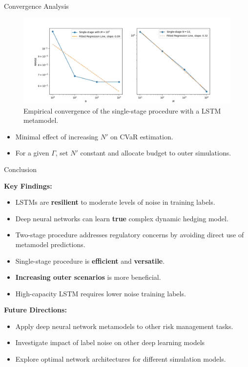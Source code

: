 \documentclass[9pt,handout]{beamer}
\begin{document}
\begin{frame}{Convergence Analysis}
    \begin{figure}[ht!]
        \centering
        \includegraphics[width=\textwidth]{../project2/figures/singleStage/MSEConvergence_lstmLoCap_MN.png}
        \caption{Empirical convergence of the single-stage procedure with a LSTM metamodel.} 
    \end{figure}

    \begin{itemize}
        \item   Minimal effect of increasing $N'$ on CVaR estimation.
        \item   For a given $\Gamma$, set $N'$ constant and allocate budget to outer simulations.
    \end{itemize}

\end{frame}

\begin{frame}{Conclusion}

    \textbf{Key Findings:}
    \begin{itemize}
        \item   LSTMs are \textbf{resilient} to moderate levels of noise in training labels.
        \item   Deep neural networks can learn \textbf{true} complex dynamic hedging model.
        \item   Two-stage procedure addresses regulatory concerns by avoiding direct use of metamodel predictions.
        \item   Single-stage procedure is \textbf{efficient} and \textbf{versatile}.
        \item   \textbf{Increasing outer scenarios} is more beneficial.
        \item   High-capacity LSTM requires lower noise training labels.
    \end{itemize}

    \vspace{10pt}

    \textbf{Future Directions:}
    \begin{itemize}
        \item   Apply deep neural network metamodels to other risk management tasks.
        \item   Investigate impact of label noise on other deep learning models 
        \item   Explore optimal network architectures for different simulation models.
    \end{itemize}
    
\end{frame}
\end{document}
